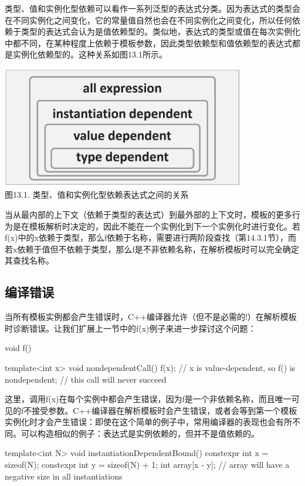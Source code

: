 类型、值和实例化型依赖可以看作一系列泛型的表达式分类。因为表达式的类型会在不同实例化之间变化，它的常量值自然也会在不同实例化之间变化，所以任何依赖于类型的表达式会认为是值依赖型的。类似地，表达式的类型或值在每次实例化中都不同，在某种程度上依赖于模板参数，因此类型依赖型和值依赖型的表达式都是实例化依赖型的。这种关系如图13.1所示。

\begin{center}
\includegraphics[width=0.8\textwidth]{part2/ch13/images/1.png} \\
图13.1. 类型、值和实例化型依赖表达式之间的关系
\end{center}

当从最内部的上下文（依赖于类型的表达式）到最外部的上下文时，模板的更多行为是在模板解析时决定的，因此不能在一个实例化到下一个实例化时进行变化。若f(x)中的x依赖于类型，那么f依赖于名称，需要进行两阶段查找（第14.3.1节），而若x依赖于值但不依赖于类型，那么f是不非依赖名称，在解析模板时可以完全确定其查找名称。

\subsection{编译错误}

当所有模板实例都会产生错误时，C++编译器允许（但不是必需的!）在解析模板时诊断错误。让我们扩展上一节中的f(x)例子来进一步探讨这个问题：

\begin{cpp}
void f() { }

template<int x> void nondependentCall() {
	f(x); // x is value-dependent, so f() is nondependent;
	// this call will never succeed
}
\end{cpp}

这里，调用f(x)在每个实例中都会产生错误，因为f是一个非依赖名称，而且唯一可见的f不接受参数。C++编译器在解析模板时会产生错误，或者会等到第一个模板实例化时才会产生错误：即使在这个简单的例子中，常用编译器的表现也会有所不同。可以构造相似的例子：表达式是实例依赖的，但并不是值依赖的。

\begin{cpp}
template<int N> void instantiationDependentBound() {
	constexpr int x = sizeof(N);
	constexpr int y = sizeof(N) + 1;
	int array[x - y]; // array will have a negative size in all instantiations
}
\end{cpp}











